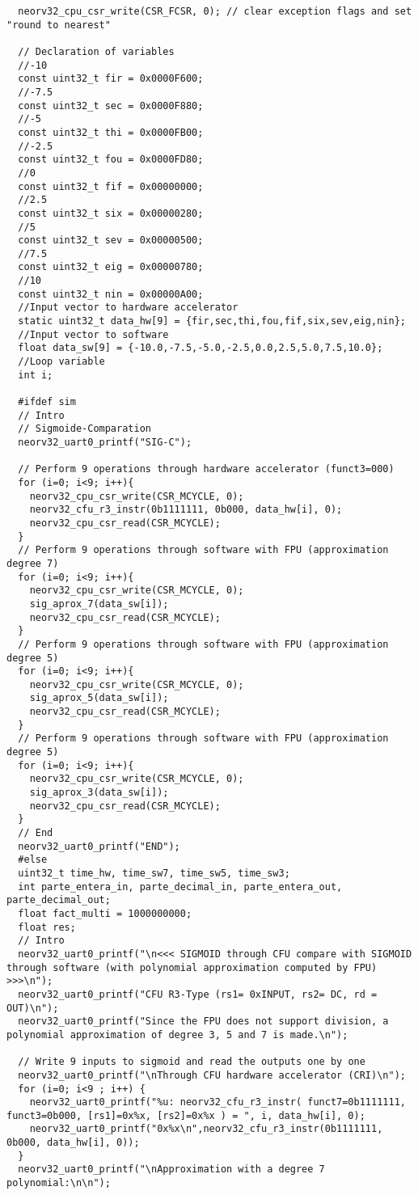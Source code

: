 \begin{code}
\begin{verbatim}
  neorv32_cpu_csr_write(CSR_FCSR, 0); // clear exception flags and set "round to nearest"

  // Declaration of variables 
  //-10
  const uint32_t fir = 0x0000F600;
  //-7.5
  const uint32_t sec = 0x0000F880;
  //-5
  const uint32_t thi = 0x0000FB00;
  //-2.5
  const uint32_t fou = 0x0000FD80;
  //0
  const uint32_t fif = 0x00000000;
  //2.5
  const uint32_t six = 0x00000280;
  //5
  const uint32_t sev = 0x00000500;
  //7.5
  const uint32_t eig = 0x00000780;
  //10
  const uint32_t nin = 0x00000A00;
  //Input vector to hardware accelerator
  static uint32_t data_hw[9] = {fir,sec,thi,fou,fif,six,sev,eig,nin};
  //Input vector to software
  float data_sw[9] = {-10.0,-7.5,-5.0,-2.5,0.0,2.5,5.0,7.5,10.0};
  //Loop variable
  int i;

  #ifdef sim
  // Intro
  // Sigmoide-Comparation
  neorv32_uart0_printf("SIG-C");

  // Perform 9 operations through hardware accelerator (funct3=000)
  for (i=0; i<9; i++){
    neorv32_cpu_csr_write(CSR_MCYCLE, 0);
    neorv32_cfu_r3_instr(0b1111111, 0b000, data_hw[i], 0); 
    neorv32_cpu_csr_read(CSR_MCYCLE); 
  }
  // Perform 9 operations through software with FPU (approximation degree 7)
  for (i=0; i<9; i++){
    neorv32_cpu_csr_write(CSR_MCYCLE, 0);
    sig_aprox_7(data_sw[i]);
    neorv32_cpu_csr_read(CSR_MCYCLE); 
  }
  // Perform 9 operations through software with FPU (approximation degree 5)
  for (i=0; i<9; i++){
    neorv32_cpu_csr_write(CSR_MCYCLE, 0);
    sig_aprox_5(data_sw[i]);
    neorv32_cpu_csr_read(CSR_MCYCLE); 
  }
  // Perform 9 operations through software with FPU (approximation degree 5)
  for (i=0; i<9; i++){
    neorv32_cpu_csr_write(CSR_MCYCLE, 0);
    sig_aprox_3(data_sw[i]);
    neorv32_cpu_csr_read(CSR_MCYCLE); 
  }
  // End
  neorv32_uart0_printf("END");
  #else
  uint32_t time_hw, time_sw7, time_sw5, time_sw3;
  int parte_entera_in, parte_decimal_in, parte_entera_out, parte_decimal_out;
  float fact_multi = 1000000000;
  float res;
  // Intro
  neorv32_uart0_printf("\n<<< SIGMOID through CFU compare with SIGMOID through software (with polynomial approximation computed by FPU) >>>\n");
  neorv32_uart0_printf("CFU R3-Type (rs1= 0xINPUT, rs2= DC, rd = OUT)\n");
  neorv32_uart0_printf("Since the FPU does not support division, a polynomial approximation of degree 3, 5 and 7 is made.\n");

  // Write 9 inputs to sigmoid and read the outputs one by one 
  neorv32_uart0_printf("\nThrough CFU hardware accelerator (CRI)\n");
  for (i=0; i<9 ; i++) {
    neorv32_uart0_printf("%u: neorv32_cfu_r3_instr( funct7=0b1111111, funct3=0b000, [rs1]=0x%x, [rs2]=0x%x ) = ", i, data_hw[i], 0);
    neorv32_uart0_printf("0x%x\n",neorv32_cfu_r3_instr(0b1111111, 0b000, data_hw[i], 0)); 
  } 
  neorv32_uart0_printf("\nApproximation with a degree 7 polynomial:\n\n");


\end{verbatim}
\end{code}
